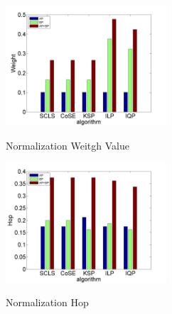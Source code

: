 \begin{figure}
  \centering
  \includegraphics[width=2.35in]{franz/weight}\\
  \caption{Normalization Weitgh Value}\label{fig:normalization weitgh sum}
\end{figure}
\begin{figure}
  \centering
  \includegraphics[width=2.35in]{franz/hop}\\
  \caption{Normalization Hop}\label{fig:normalization hop}
\end{figure}

